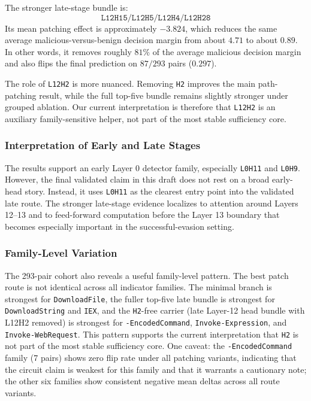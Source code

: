 \documentclass{article}
\begin{document}
The stronger late-stage bundle is:
\[
\texttt{L12H15/L12H5/L12H4/L12H28}
\]
Its mean patching effect is approximately \(-3.824\), which reduces the same average malicious-versus-benign decision margin from about \(4.71\) to about \(0.89\). In other words, it removes roughly \(81\%\) of the average malicious decision margin and also flips the final prediction on \(87/293\) pairs (\(0.297\)).

The role of \texttt{L12H2} is more nuanced. Removing \texttt{H2} improves the main path-patching result, while the full top-five bundle remains slightly stronger under grouped ablation. Our current interpretation is therefore that \texttt{L12H2} is an auxiliary family-sensitive helper, not part of the most stable sufficiency core.

\subsubsection{Interpretation of Early and Late Stages}
The results support an early Layer 0 detector family, especially \texttt{L0H11} and \texttt{L0H9}. However, the final validated claim in this draft does not rest on a broad early-head story. Instead, it uses \texttt{L0H11} as the clearest entry point into the validated late route. The stronger late-stage evidence localizes to attention around Layers 12--13 and to feed-forward computation before the Layer 13 boundary that becomes especially important in the successful-evasion setting.

\subsubsection{Family-Level Variation}
The 293-pair cohort also reveals a useful family-level pattern. The best patch route is not identical across all indicator families. The minimal branch is strongest for \texttt{DownloadFile}, the fuller top-five late bundle is strongest for \texttt{DownloadString} and \texttt{IEX}, and the \texttt{H2}-free carrier (late Layer-12 head bundle with L12H2 removed) is strongest for \texttt{-EncodedCommand}, \texttt{Invoke-Expression}, and \texttt{Invoke-WebRequest}. This pattern supports the current interpretation that \texttt{H2} is not part of the most stable sufficiency core. One caveat: the \texttt{-EncodedCommand} family (7 pairs) shows zero flip rate under all patching variants, indicating that the circuit claim is weakest for this family and that it warrants a cautionary note; the other six families show consistent negative mean deltas across all route variants.
\end{document}
